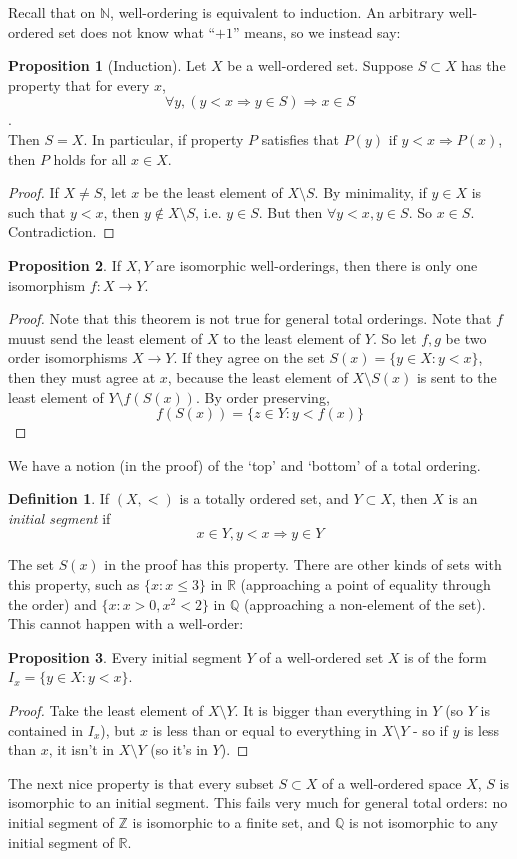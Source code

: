 \documentclass{article}
\theoremstyle{definition}
\newtheorem{definition}{Definition}
\newtheorem{proposition}{Proposition}
\numberwithin{definition}{section}
\begin{document}
Recall that on $\mathbb{N}$, well-ordering is equivalent to induction. An arbitrary well-ordered set does not know what ``$+1$'' means, so we instead say:
\begin{proposition}[Induction]
Let $X$ be a well-ordered set. Suppose $S \subset X$ has the property that for every $x$,
$$\forall y,( y<x \Rightarrow y \in S) \Rightarrow x \in S $$.\\
Then $S=X$. In particular, if property $P$ satisfies that $P(y) \text{ if } y<x \Rightarrow P(x)$, then $P$ holds for all $x \in X$. 
\end{proposition}
\begin{proof}
If $X \ne S$, let $x$ be the least element of $X \setminus S$. By minimality, if $y \in X$ is such that $y < x$, then $y \notin X \setminus S$, i.e. $y \in S$. But then $\forall y < x, y \in S$. So $x \in S$. Contradiction.
\end{proof}
\begin{proposition}
If $X,Y$ are isomorphic well-orderings, then there is only one isomorphism $f:X \to Y$. 
\end{proposition}
\begin{proof}
Note that this theorem is not true for general total orderings. Note that $f$ muust send the least element of $X$ to the least element of $Y$. So let $f,g$ be two order isomorphisms $X \to Y$. If they agree on the set $S(x) = \{y \in X : y<x\}$, then they must agree at $x$, because the least element of $X \setminus S(x)$ is sent to the least element of $Y \setminus f(S(x))$. By order preserving, $$f(S(x)) = \{z \in Y : y < f(x)\}$$
\end{proof}
We have a notion (in the proof) of the `top' and `bottom' of a total ordering. 
\begin{definition}
If $(X,<)$ is a totally ordered set, and $Y \subset X$, then $X$ is an \textit{initial segment} if 
$$x \in Y,y < x \Rightarrow y \in Y$$
\end{definition}
The set $S(x)$ in the proof has this property. There are other kinds of sets with this property, such as $\{x:x \le 3\}$ in $\mathbb{R}$ (approaching a point of equality through the order) and $\{x: x>0, x^{2} < 2\}$ in $\mathbb{Q}$ (approaching a non-element of the set). This cannot happen with a well-order:

\begin{proposition}
Every initial segment $Y$ of a well-ordered set $X$ is of the form $I_{x} = \{y \in X: y < x\}$. 
\end{proposition}
\begin{proof}
Take the least element of $X \setminus Y$. It is bigger than everything in $Y$ (so $Y$ is contained in $I_{x}$), but $x$ is less than or equal to everything in $X \setminus Y$ - so if $y$ is less than $x$, it isn't in $X \setminus Y$ (so it's in $Y$). 
\end{proof}
The next nice property is that every subset $S \subset X$ of a well-ordered space $X$, $S$ is isomorphic to an initial segment. This fails very much for general total orders: no initial segment of $\mathbb{Z}$ is isomorphic to a finite set, and $\mathbb{Q}$ is not isomorphic to any initial segment of $\mathbb{R}$. \\
\end{document}
